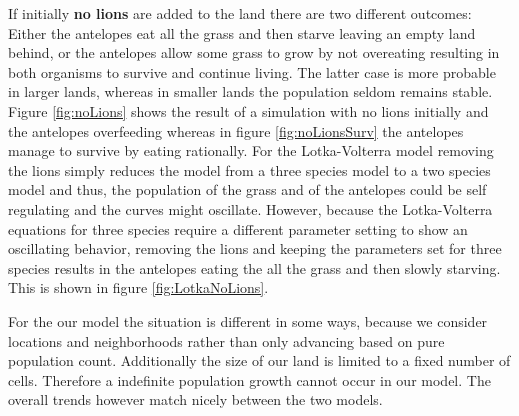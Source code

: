 \documentclass[11pt]{article}
\begin{document}
If initially {\bf no lions} are added to the land there are two different outcomes: Either the antelopes eat all the grass and then starve leaving an empty land behind, or the antelopes allow some grass to grow by not overeating resulting in both organisms to survive and continue living. The latter case is more probable in larger lands, whereas in smaller lands the population seldom remains stable. Figure \ref{fig:noLions} shows the result of a simulation with no lions initially and the antelopes overfeeding whereas in figure \ref{fig:noLionsSurv} the antelopes manage to survive by eating rationally. For the Lotka-Volterra model removing the lions simply reduces the model from a three species model to a two species model and thus, the population of the grass and of the antelopes could be self regulating and the curves might oscillate. However, because the Lotka-Volterra equations for three species require a different parameter setting to show an oscillating behavior, removing the lions and keeping the parameters set for three species results in the antelopes eating the all the grass and then slowly starving. This is shown in figure \ref{fig:LotkaNoLions}.



For the our model the situation is different in some ways, because we consider locations and neighborhoods rather than only advancing based on pure population count. Additionally the size of our land is limited to a fixed number of cells. Therefore a indefinite population growth cannot occur in our model. The overall trends however match nicely between the two models.
\end{document}
